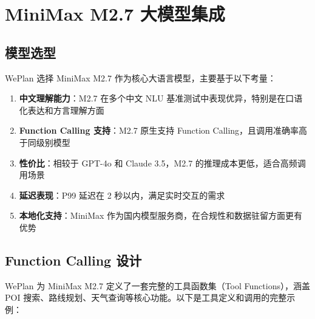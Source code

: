 \documentclass[12pt,a4paper]{ctexart}
\begin{document}
\section{MiniMax M2.7 大模型集成}

\subsection{模型选型}

WePlan 选择 MiniMax M2.7 作为核心大语言模型，主要基于以下考量：

\begin{enumerate}[leftmargin=2em]
  \item \textbf{中文理解能力}：M2.7 在多个中文 NLU 基准测试中表现优异，特别是在口语化表达和方言理解方面
  \item \textbf{Function Calling 支持}：M2.7 原生支持 Function Calling，且调用准确率高于同级别模型
  \item \textbf{性价比}：相较于 GPT-4o 和 Claude 3.5，M2.7 的推理成本更低，适合高频调用场景
  \item \textbf{延迟表现}：P99 延迟在 2 秒以内，满足实时交互的需求
  \item \textbf{本地化支持}：MiniMax 作为国内模型服务商，在合规性和数据驻留方面更有优势
\end{enumerate}

\subsection{Function Calling 设计}

WePlan 为 MiniMax M2.7 定义了一套完整的工具函数集（Tool Functions），涵盖 POI 搜索、路线规划、天气查询等核心功能。以下是工具定义和调用的完整示例：
\end{document}
